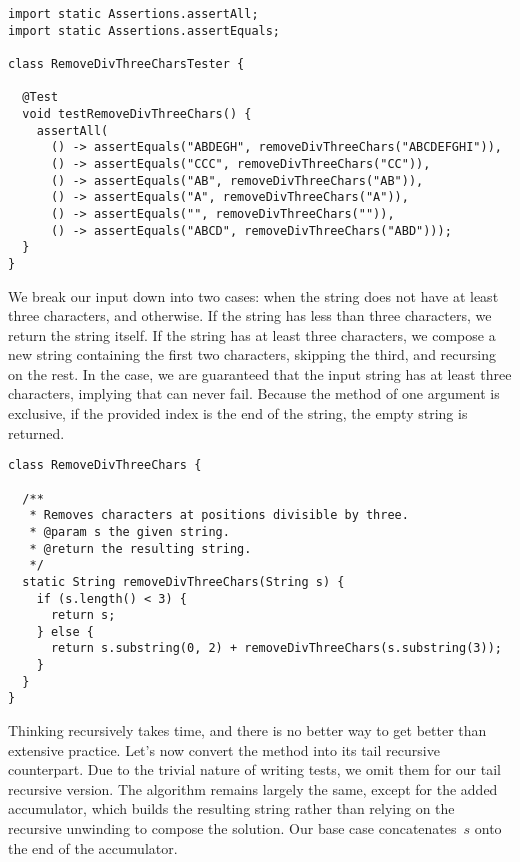 \begin{lstlisting}[language=MyJava]
import static Assertions.assertAll;
import static Assertions.assertEquals;

class RemoveDivThreeCharsTester {

  @Test
  void testRemoveDivThreeChars() {
    assertAll(
      () -> assertEquals("ABDEGH", removeDivThreeChars("ABCDEFGHI")),
      () -> assertEquals("CCC", removeDivThreeChars("CC")),
      () -> assertEquals("AB", removeDivThreeChars("AB")),
      () -> assertEquals("A", removeDivThreeChars("A")),
      () -> assertEquals("", removeDivThreeChars("")),
      () -> assertEquals("ABCD", removeDivThreeChars("ABD")));
  }
}
\end{lstlisting}

We break our input down into two cases: when the string does not have at least three characters, and otherwise. 
If the string has less than three characters, we return the string itself. 
If the string has at least three characters, we compose a new string containing the first two characters, skipping the third, and recursing on the rest. 
In the  case, we are guaranteed that the input string has at least three characters, implying that  can never fail. 
Because the  method of one argument is exclusive, if the provided index is the end of the string, the empty string is returned.

\begin{lstlisting}[language=MyJava]
class RemoveDivThreeChars {

  /**
   * Removes characters at positions divisible by three.
   * @param s the given string.
   * @return the resulting string.
   */
  static String removeDivThreeChars(String s) {
    if (s.length() < 3) {
      return s;
    } else {
      return s.substring(0, 2) + removeDivThreeChars(s.substring(3));
    }
  }
}
\end{lstlisting}

Thinking recursively takes time, and there is no better way to get better than extensive practice. Let's now convert the method into its tail recursive counterpart. 
Due to the trivial nature of writing tests, we omit them for our tail recursive version. 
The algorithm remains largely the same, except for the added accumulator, which builds the resulting string rather than relying on the recursive unwinding to compose the solution. 
Our base case concatenates~$s$ onto the end of the accumulator.

